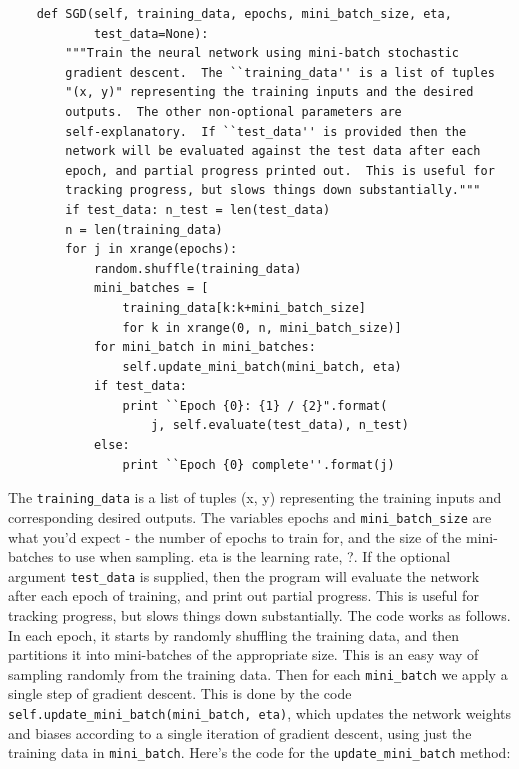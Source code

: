 \begin{lstlisting}
    def SGD(self, training_data, epochs, mini_batch_size, eta,
            test_data=None):
        """Train the neural network using mini-batch stochastic
        gradient descent.  The ``training_data'' is a list of tuples
        "(x, y)" representing the training inputs and the desired
        outputs.  The other non-optional parameters are
        self-explanatory.  If ``test_data'' is provided then the
        network will be evaluated against the test data after each
        epoch, and partial progress printed out.  This is useful for
        tracking progress, but slows things down substantially."""
        if test_data: n_test = len(test_data)
        n = len(training_data)
        for j in xrange(epochs):
            random.shuffle(training_data)
            mini_batches = [
                training_data[k:k+mini_batch_size]
                for k in xrange(0, n, mini_batch_size)]
            for mini_batch in mini_batches:
                self.update_mini_batch(mini_batch, eta)
            if test_data:
                print ``Epoch {0}: {1} / {2}".format(
                    j, self.evaluate(test_data), n_test)
            else:
                print ``Epoch {0} complete''.format(j)
\end{lstlisting}
                
The \lstinline{training_data} is a list of tuples (x, y) representing the training inputs and corresponding desired outputs. The variables epochs and \lstinline{mini_batch_size} are what you'd expect - the number of epochs to train for, and the size of the mini-batches to use when sampling. eta is the learning rate, ?. If the optional argument \lstinline{test_data} is supplied, then the program will evaluate the network after each epoch of training, and print out partial progress. This is useful for tracking progress, but slows things down substantially.
The code works as follows. In each epoch, it starts by randomly shuffling the training data, and then partitions it into mini-batches of the appropriate size. This is an easy way of sampling randomly from the training data. Then for each \lstinline{mini_batch} we apply a single step of gradient descent. This is done by the code \lstinline{self.update_mini_batch(mini_batch, eta)}, which updates the network weights and biases according to a single iteration of gradient descent, using just the training data in \lstinline{mini_batch}. Here's the code for the \lstinline{update_mini_batch} method: 

